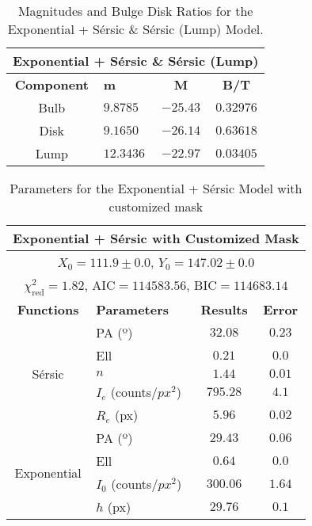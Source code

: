 \begin{table}[!htb]
    \renewcommand{\thetable}{S2}
    \centering
    \begin{tabular}{|c|l|c|c|}
        \hline
        \multicolumn{4}{|c|}{\textbf{Exponential + Sérsic \& Sérsic (Lump)}} \\
        \hline
        \textbf{Component} & \textbf{m} & \textbf{M} & \textbf{B/T} \\
        \hline
        Bulb & \(9.8785\) & \(-25.43\) & \(0.32976\) \\
        \hline
        Disk & \(9.1650\) & \(-26.14\) & \(0.63618\) \\
        \hline
        Lump & \(12.3436\) & \(-22.97\) & \(0.03405\) \\
        \hline
    \end{tabular}
    \caption{Magnitudes and Bulge Disk Ratios for the Exponential + Sérsic \& Sérsic (Lump) Model. }
\end{table}


\newpage


\begin{table}[!htb]
    \renewcommand{\thetable}{S3}
    \centering
    \begin{tabular}{|c|l|c|c|}
        \hline
        \multicolumn{4}{|c|}{\textbf{Exponential + Sérsic with Customized Mask}} \\
        \hline
        \multicolumn{4}{|c|}{\(X_{0} = 111.9 \pm 0.0\), \(Y_{0} = 147.02 \pm 0.0\)} \\
        \hline
        \multicolumn{4}{|c|}{\(\chi_{\text{red}}^{2} = 1.82\), \(\text{AIC} = 114583.56\), \(\text{BIC} = 114683.14\)} \\
        \hline
        \textbf{Functions} & \textbf{Parameters} & \textbf{Results} & \textbf{Error} \\
        \hline
        \multirow{5}{*}{Sérsic}
        & PA (º) & \(32.08\) & \(0.23\) \\
        & Ell & \(0.21\) & \(0.0\) \\
        & \(n\) & \(1.44\) & \(0.01\) \\
        & \(I_{e}\) (counts/\(px^{2}\)) & \(795.28\) & \(4.1\) \\
        & \(R_{e}\) (px) & \(5.96\) & \(0.02\) \\
        \hline
        \multirow{4}{*}{Exponential}
        & PA (º) & \(29.43\) & \(0.06\) \\
        & Ell & \(0.64\) & \(0.0\) \\
        & \(I_{0}\) (counts/\(px^{2}\)) & \(300.06\) & \(1.64\) \\
        & \(h\) (px) & \(29.76\) & \(0.1\) \\
        \hline
    \end{tabular}
    \caption{Parameters for the Exponential + Sérsic Model with customized mask}
\end{table}

